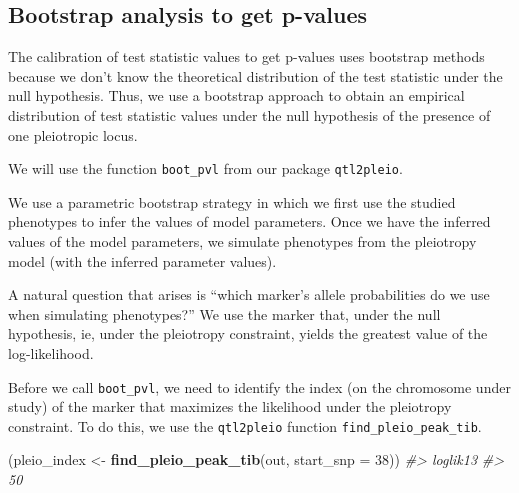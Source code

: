 \documentclass[oneside]{book}
\newenvironment{Shaded}{\begin{snugshade}}{\end{snugshade}}
\newcommand{\CommentTok}[1]{\textcolor[rgb]{0.56,0.35,0.01}{\textit{#1}}}
\newcommand{\DataTypeTok}[1]{\textcolor[rgb]{0.13,0.29,0.53}{#1}}
\newcommand{\DecValTok}[1]{\textcolor[rgb]{0.00,0.00,0.81}{#1}}
\newcommand{\KeywordTok}[1]{\textcolor[rgb]{0.13,0.29,0.53}{\textbf{#1}}}
\newcommand{\NormalTok}[1]{#1}
\newcommand{\StringTok}[1]{\textcolor[rgb]{0.31,0.60,0.02}{#1}}
\begin{document}
\hypertarget{bootstrap-analysis-to-get-p-values}{%
\subsection{Bootstrap analysis to get
p-values}\label{bootstrap-analysis-to-get-p-values}}

The calibration of test statistic values to get p-values uses bootstrap
methods because we don't know the theoretical distribution of the test
statistic under the null hypothesis. Thus, we use a bootstrap approach
to obtain an empirical distribution of test statistic values under the
null hypothesis of the presence of one pleiotropic locus.

We will use the function \texttt{boot\_pvl} from our package
\texttt{qtl2pleio}.

We use a parametric bootstrap strategy in which we first use the studied
phenotypes to infer the values of model parameters. Once we have the
inferred values of the model parameters, we simulate phenotypes from the
pleiotropy model (with the inferred parameter values).

A natural question that arises is ``which marker's allele probabilities
do we use when simulating phenotypes?'' We use the marker that, under
the null hypothesis, ie, under the pleiotropy constraint, yields the
greatest value of the log-likelihood.

Before we call \texttt{boot\_pvl}, we need to identify the index (on the
chromosome under study) of the marker that maximizes the likelihood
under the pleiotropy constraint. To do this, we use the
\texttt{qtl2pleio} function \texttt{find\_pleio\_peak\_tib}.

\begin{Shaded}
\begin{Highlighting}[]
\NormalTok{(pleio_index <-}\StringTok{ }\KeywordTok{find_pleio_peak_tib}\NormalTok{(out, }\DataTypeTok{start_snp =} \DecValTok{38}\NormalTok{))}
\CommentTok{#> loglik13 }
\CommentTok{#>       50}
\end{Highlighting}
\end{Shaded}
\end{document}
